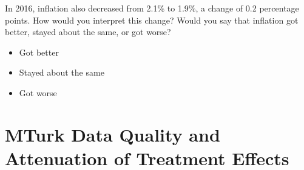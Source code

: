 \documentclass[12pt, letterpaper]{article}
\begin{document}
\bigskip

\noindent In 2016, inflation also decreased from 2.1\% to 1.9\%, a change of 0.2 percentage points. How would you interpret this change? Would you say that inflation got better, stayed about the same, or got worse? 

\begin{itemize}
\item Got better
\item Stayed about the same 
\item Got worse
\end{itemize}

\clearpage


\section{MTurk Data Quality and Attenuation of Treatment Effects} \label{si:exp_results_full}
\end{document}
